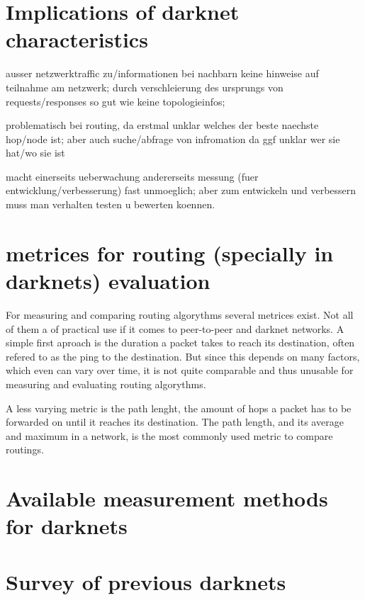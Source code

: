 \section{Implications of darknet characteristics}

ausser netzwerktraffic zu/informationen bei nachbarn keine hinweise auf teilnahme am netzwerk; durch verschleierung des ursprungs von requests/responses so gut wie keine topologieinfos;

problematisch bei routing, da erstmal unklar welches der beste naechste hop/node ist; aber auch suche/abfrage von infromation da ggf unklar wer sie hat/wo sie ist

macht einerseits ueberwachung andererseits messung (fuer entwicklung/verbesserung) fast unmoeglich; aber zum entwickeln und verbessern muss man verhalten testen u bewerten koennen.

\section{metrices for routing (specially in darknets) evaluation}

For measuring and comparing routing algorythms several metrices exist. Not all of them a of practical use if it comes to peer-to-peer and darknet networks. A simple first aproach  is the duration a packet takes to reach its destination, often refered to as the ping to the destination. But since this depends on many factors, which even can vary over time, it is not quite comparable and thus unusable for measuring and evaluating routing algorythms.

A less varying metric is the path lenght, the amount of hops a packet has to be forwarded on until it reaches its destination. The path length, and its average and maximum in a network, is the most commonly used metric to compare routings.



\section{Available measurement methods for darknets}

\section{Survey of previous darknets}


